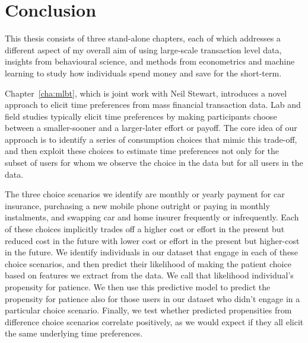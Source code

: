 
\chapter{Conclusion}%
\label{cha:conclusion}

This thesis consists of three stand-alone chapters, each of which addresses a
different aspect of my overall aim of using large-scale transaction level data,
insights from behavioural science, and methods from econometrics and machine
learning to study how individuals spend money and save for the short-term.

Chapter~\ref{cha:mlbt}, which is joint work with Neil Stewart, introduces a
novel approach to elicit time preferences from mass financial transaction data.
Lab and field studies typically elicit time preferences by making participants
choose between a smaller-sooner and a larger-later effort or payoff. The core
idea of our approach is to identify a series of consumption choices that mimic
this trade-off, and then exploit these choices to estimate time preferences not
only for the subset of users for whom we observe the choice in the data but for
all users in the data.

The three choice scenarios we identify are monthly or yearly payment for car
insurance, purchasing a new mobile phone outright or paying in monthly
instalments, and swapping car and home insurer frequently or infrequently.
Each of these choices implicitly trades off a higher cost or effort in the
present but reduced cost in the future with lower cost or effort in the present
but higher-cost in the future. We identify individuals in our dataset that
engage in each of these choice scenarios, and then predict their likelihood of
making the patient choice based on features we extract from the data. We call
that likelihood individual's propensity for patience. We then use this
predictive model to predict the propensity for patience also for those users in
our dataset who didn't engage in a particular choice scenario. Finally, we test
whether predicted propensities from difference choice scenarios correlate
positively, as we would expect if they all elicit the same underlying time
preferences.

